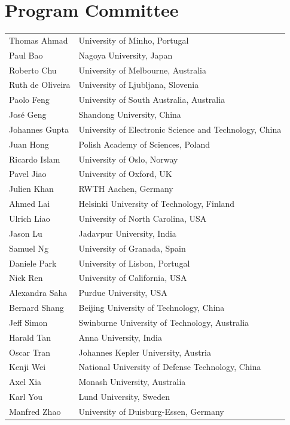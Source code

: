 \documentclass[runningheads]{llncs}
\begin{document}
\section*{Program Committee}
\begin{longtable}{p{}p{}}
Thomas Ahmad        & University of Minho, Portugal\\
Paul Bao            & Nagoya University, Japan\\
Roberto Chu         & University of Melbourne, Australia\\
Ruth de Oliveira    & University of Ljubljana, Slovenia\\
Paolo Feng          & University of South Australia, Australia\\
Jos\'{e} Geng       & Shandong University, China\\
Johannes Gupta      & University of Electronic Science and Technology, China\\
Juan Hong           & Polish Academy of Sciences, Poland\\
Ricardo Islam       & University of Oslo, Norway\\
Pavel Jiao          & University of Oxford, UK\\
Julien Khan         & RWTH Aachen, Germany\\
Ahmed Lai           & Helsinki University of Technology, Finland\\
Ulrich Liao         & University of North Carolina, USA\\
Jason Lu            & Jadavpur University, India\\
Samuel Ng           & University of Granada, Spain\\
Daniele Park        & University of Lisbon, Portugal\\
Nick Ren            & University of California, USA\\
Alexandra Saha      & Purdue University, USA\\
Bernard Shang       & Beijing University of Technology, China\\
Jeff Simon          & Swinburne University of Technology, Australia\\
Harald Tan          & Anna University, India\\
Oscar Tran          & Johannes Kepler University, Austria\\
Kenji Wei           & National University of Defense Technology, China\\
Axel Xia            & Monash University, Australia\\
Karl You            & Lund University, Sweden\\
Manfred Zhao        & University of Duisburg-Essen, Germany
\end{longtable}
\end{document}
